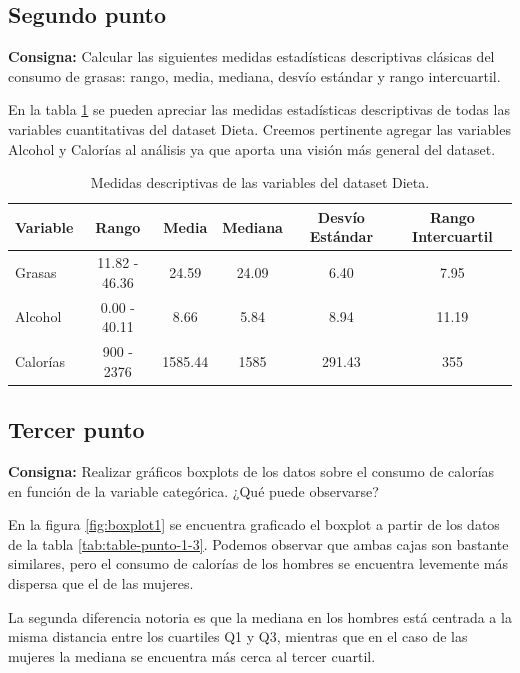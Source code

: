 \documentclass{article} %
\begin{document}
\subsection{Segundo punto}

\textbf{Consigna:} Calcular las siguientes medidas estadísticas descriptivas clásicas del consumo de grasas: rango, media, mediana, desvío estándar y rango intercuartil.

En la tabla \ref{tab:table-punto-1-2} se pueden apreciar las medidas estadísticas descriptivas de todas las variables cuantitativas del dataset Dieta. Creemos pertinente agregar las variables Alcohol y Calorías al análisis ya que aporta una visión más general del dataset.

\begin{table}[H]
	\centering
		\begin{tabular}{||l || c | c | c | c | c ||}
			\hline
			\hline
			Variable & Rango & Media & Mediana & Desvío Estándar & Rango Intercuartil\\
			\hline			
			\hline
			Grasas & 11.82 - 46.36 & 24.59 & 24.09 & 6.40 & 7.95\\
			\hline
			Alcohol & 0.00 - 40.11 & 8.66 & 5.84 & 8.94 & 11.19\\
			\hline
			Calorías & 900 - 2376 & 1585.44 & 1585 & 291.43 & 355\\
			\hline
			\hline
		\end{tabular}
		\caption{Medidas descriptivas de las variables del dataset Dieta.}
	\label{tab:table-punto-1-2}
\end{table}

\subsection{Tercer punto}

\textbf{Consigna:} Realizar gráficos boxplots de los datos sobre el consumo de calorías en función de la variable categórica. ¿Qué puede observarse?

En la figura \ref{fig:boxplot1} se encuentra graficado el boxplot a partir de los datos de la tabla \ref{tab:table-punto-1-3}. Podemos observar que ambas cajas son bastante similares, pero el consumo de calorías de los hombres se encuentra levemente más dispersa que el de las mujeres. 

La segunda diferencia notoria es que la mediana en los hombres está centrada a la misma distancia entre los cuartiles Q1 y Q3, mientras que en el caso de las mujeres la mediana se encuentra más cerca al tercer cuartil.
\end{document}
